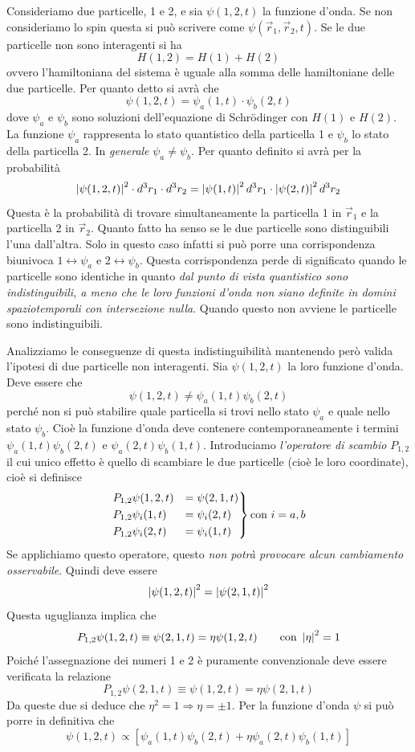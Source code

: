 Consideriamo due particelle, 1 e 2, e sia $\psi(1,2,t)$ la funzione d'onda. Se
non consideriamo lo spin questa si può scrivere come $\psi(\vec{r}_1, \vec{r}_2,
t)$. Se le due particelle non sono interagenti si ha
\[
H(1,2) = H(1) + H(2)
\]
ovvero l'hamiltoniana del sistema è uguale alla somma delle hamiltoniane delle
due particelle. Per quanto detto si avrà che
\[
\psi(1,2,t) = \psi_a(1,t)\cdot \psi_b(2,t)
\]
dove $\psi_a$ e $\psi_b$ sono soluzioni dell'equazione di Schr\"odinger con
$H(1)$ e $H(2)$. La funzione $\psi_a$ rappresenta lo stato quantistico della
particella 1 e $\psi_b$ lo stato della particella 2. In \textit{generale}
$\psi_a \neq \psi_b$. Per quanto definito si avrà per la probabilità
\[
\left| \psi(1,2,t) \right|^2\cdot d^3r_1\cdot d^3r_2 = \left| \psi(1,t) \right|^2d^3r_1\cdot
\left| \psi(2,t) \right|^2d^3r_2
\]
Questa è la probabilità di trovare simultaneamente la particella 1 in
$\vec{r}_1$ e la particella 2 in $\vec{r}_2$. Quanto fatto ha senso se le due
particelle sono distinguibili l'una dall'altra. Solo in questo caso infatti si
può porre una corrispondenza biunivoca $1\leftrightarrow\psi_a$ e
$2\leftrightarrow\psi_b$. Questa corrispondenza perde di significato quando le
particelle sono identiche in quanto \textit{dal punto di vista quantistico sono
indistinguibili, a meno che le loro funzioni d'onda non siano definite in domini
spaziotemporali con intersezione nulla}. Quando questo non avviene le particelle
sono indistinguibili.

Analizziamo le conseguenze di questa indistinguibilità mantenendo però valida
l'ipotesi di due particelle non interagenti. Sia $\psi(1,2,t)$ la loro funzione
d'onda. Deve essere che
\[
\psi(1,2,t) \neq \psi_a(1,t)\psi_b(2,t)
\]
perché non si può stabilire quale particella si trovi nello stato $\psi_a$ e
quale nello stato $\psi_b$. Cioè la funzione d'onda deve contenere
contemporaneamente i termini $\psi_a(1,t)\psi_b(2,t)$ e
$\psi_a(2,t)\psi_b(1,t)$. Introduciamo \textit{l'operatore di scambio} $P_{1,2}$
il cui unico effetto è quello di scambiare le due particelle (cioè le loro
coordinate), cioè si definisce
\begin{equation}
\begin{rcases}
P_{1,2}\psi(1,2,t) &= \psi(2,1,t)\\
P_{1,2} \psi_i(1,t) &= \psi_i(2,t)\\
P_{1,2} \psi_i(2,t) &= \psi_i(1,t)
\end{rcases}\text{con }i=a,b
\end{equation}
Se applichiamo questo operatore, questo \textit{non potrà provocare alcun
cambiamento osservabile}. Quindi deve essere
\[
\left| \psi(1,2,t) \right|^2 = \left| \psi(2,1,t) \right|^2
\]
Questa uguglianza implica che
\[
P_{1,2}\psi(1,2,t) \equiv \psi(2,1,t) = \eta\psi(1,2,t)\qquad\text{con }\left| \eta \right|^2 = 1
\]
Poiché l'assegnazione dei numeri 1 e 2 è puramente convenzionale deve essere
verificata la relazione
\[
P_{1,2}\psi(2,1,t) \equiv \psi(1,2,t) = \eta\psi(2,1,t)
\]
Da queste due si deduce che $\eta^2=1\Rightarrow\eta=\pm 1$. Per la funzione
d'onda $\psi$ si può porre in definitiva che
\begin{equation}
\psi(1,2,t)\propto[\psi_a(1,t)\psi_b(2,t) + \eta\psi_a(2,t)\psi_b(1,t)]
\end{equation}


